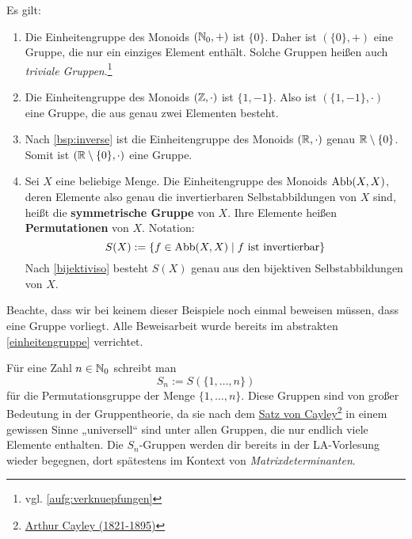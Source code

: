 \begin{bsp}  
    Es gilt:
    \begin{enumerate}
        \item Die Einheitengruppe des Monoids $(\mathbb N_0,+)$ ist $\{0\}$. Daher ist $(\{0\},+)$ eine Gruppe, die nur ein einziges Element enthält. Solche Gruppen heißen auch \emph{triviale Gruppen}.\footnote{vgl. \cref{aufg:verknuepfungen}}
        \item Die Einheitengruppe des Monoids $(\mathbb Z,\cdot)$ ist $\{1,-1\}$. Also ist $(\{1,-1\},\cdot)$ eine Gruppe, die aus genau zwei Elementen besteht.
        \item Nach \cref{bsp:inverse} ist die Einheitengruppe des Monoids $(\mathbb R,\cdot)$ genau $\mathbb R\setminus \{0\}$. Somit ist $(\mathbb R\setminus \{0\},\cdot)$ eine Gruppe.
        \item Sei $X$ eine beliebige Menge. Die Einheitengruppe des Monoids $\operatorname{Abb}(X,X)$, deren Elemente also genau die invertierbaren Selbstabbildungen von $X$ sind, heißt die \textbf{symmetrische Gruppe} von $X$. Ihre Elemente heißen \textbf{Permutationen} von $X$. Notation:
            \[ S(X) := \{f\in \Abb(X,X)\mid f\ \text{ist invertierbar} \} \]
        Nach \cref{bijektiviso} besteht $S(X)$ genau aus den bijektiven Selbstabbildungen von $X$.
    \end{enumerate}
    Beachte, dass wir bei keinem dieser Beispiele noch einmal beweisen müssen, dass eine Gruppe vorliegt. Alle Beweisarbeit wurde bereits im abstrakten \cref{einheitengruppe} verrichtet.
\end{bsp}


\begin{bem}
    Für eine Zahl $n\in \mathbb N_0$ schreibt man
        \[ S_n := S(\{1,\dots , n\}) \]
    für die Permutationsgruppe der Menge $\{1,\dots , n\}$. Diese Gruppen sind von großer Bedeutung in der Gruppentheorie, da sie nach dem \href{https://de.wikipedia.org/wiki/Satz_von_Cayley}{Satz von Cayley}\footnote{\href{https://de.wikipedia.org/wiki/Arthur_Cayley}{Arthur Cayley (1821-1895)}} in einem gewissen Sinne „universell“ sind unter allen Gruppen, die nur endlich viele Elemente enthalten. Die $S_n$-Gruppen werden dir bereits in der LA-Vorlesung wieder begegnen, dort spätestens im Kontext von \emph{Matrixdeterminanten}.
\end{bem}


